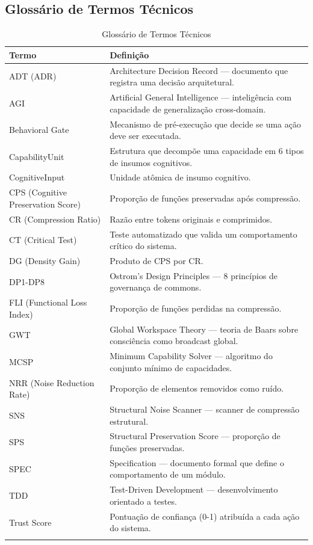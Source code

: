 \begin{apendicesenv}
\chapter{Glossário de Termos Técnicos}

\begin{longtable}{p{3.5cm}p{9.5cm}}
\toprule
\textbf{Termo} & \textbf{Definição} \\
\midrule
ADT (ADR) & Architecture Decision Record — documento que registra uma decisão arquitetural. \\
AGI & Artificial General Intelligence — inteligência com capacidade de generalização cross-domain. \\
Behavioral Gate & Mecanismo de pré-execução que decide se uma ação deve ser executada. \\
CapabilityUnit & Estrutura que decompõe uma capacidade em 6 tipos de insumos cognitivos. \\
CognitiveInput & Unidade atômica de insumo cognitivo. \\
CPS (Cognitive Preservation Score) & Proporção de funções preservadas após compressão. \\
CR (Compression Ratio) & Razão entre tokens originais e comprimidos. \\
CT (Critical Test) & Teste automatizado que valida um comportamento crítico do sistema. \\
DG (Density Gain) & Produto de CPS por CR. \\
DP1-DP8 & Ostrom's Design Principles — 8 princípios de governança de commons. \\
FLI (Functional Loss Index) & Proporção de funções perdidas na compressão. \\
GWT & Global Workspace Theory — teoria de Baars sobre consciência como broadcast global. \\
MCSP & Minimum Capability Solver — algoritmo do conjunto mínimo de capacidades. \\
NRR (Noise Reduction Rate) & Proporção de elementos removidos como ruído. \\
SNS & Structural Noise Scanner — scanner de compressão estrutural. \\
SPS & Structural Preservation Score — proporção de funções preservadas. \\
SPEC & Specification — documento formal que define o comportamento de um módulo. \\
TDD & Test-Driven Development — desenvolvimento orientado a testes. \\
Trust Score & Pontuação de confiança (0-1) atribuída a cada ação do sistema. \\
\bottomrule
\caption{Glossário de Termos Técnicos}
\end{longtable}

\end{apendicesenv}
